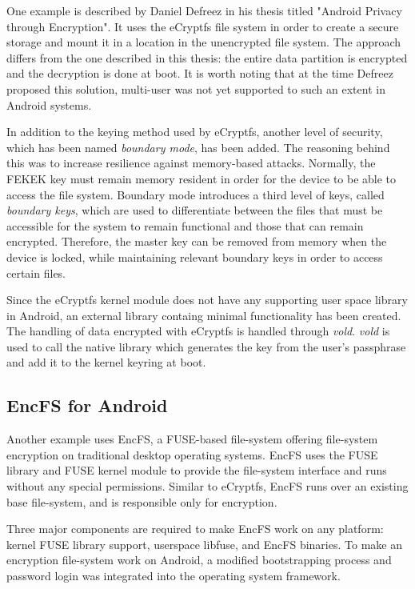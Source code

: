 One example is described by Daniel Defreez in his thesis titled "Android Privacy through Encryption"\cite{defreez}.
It uses the eCryptfs file system in order to create a secure storage and mount it in a location in the unencrypted file system. The approach differs from the one described in this thesis: the entire data partition is encrypted and the decryption is done at boot. It is worth noting that at the time Defreez proposed this solution, multi-user was not yet supported to such an extent in Android systems.

In addition to the keying method used by eCryptfs, another level of security, which has been named \textit{boundary mode}, has been added. The reasoning behind this was to increase resilience against memory-based attacks. Normally, the FEKEK key must remain memory resident in order for the device to be able to access the file system. Boundary mode introduces a third level of keys, called \textit{boundary keys}, which are used to differentiate between the files that must be accessible for the system to remain functional and those that can remain encrypted. Therefore, the master key can be removed from memory when the device is locked, while maintaining relevant boundary keys in order to access certain files.

Since the eCryptfs kernel module does not have any supporting user space library in Android, an external library containg minimal functionality has been created. The handling of data encrypted with eCryptfs is handled through \textit{vold}. \textit{vold} is used to call the native library which generates the key from the user's passphrase and add it to the kernel keyring at boot.

\subsection{EncFS for Android}
\label{sub-sec:encfs-and}

Another example\cite{encfs} uses EncFS, a FUSE-based file-system offering file-system encryption on traditional desktop operating systems. EncFS uses the FUSE library and FUSE kernel module to provide the file-system interface and runs without any special permissions. Similar to eCryptfs, EncFS runs over an existing base file-system, and is responsible only for encryption.

Three major components are required to make EncFS work on any platform: kernel FUSE library support, userspace libfuse, and EncFS binaries. To make an encryption file-system work on Android, a modified bootstrapping process and password login was integrated into the operating system framework.

